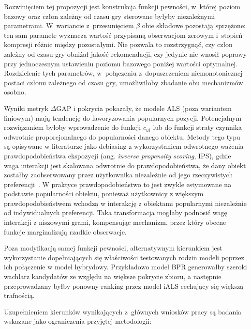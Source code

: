 Rozwinięciem tej propozycji jest konstrukcja funkcji pewności, w~której poziom bazowy oraz człon zależny od czasu gry sterowane byłyby niezależnymi parametrami. W~wariancie z~przesunięciem $\beta$ obie składowe pozostają sprzężone: ten sam parametr wyznacza wartość przypisaną obserwacjom zerowym i~stopień kompresji różnic między pozostałymi. Nie pozwala to rozstrzygnąć, czy człon zależny od czasu gry obniżał jakość rekomendacji, czy jedynie nie wnosił poprawy przy jednoczesnym ustawieniu poziomu bazowego poniżej wartości optymalnej. Rozdzielenie tych parametrów, w~połączeniu z~dopuszczeniem niemonotonicznej postaci członu zależnego od czasu gry, umożliwiłoby zbadanie obu mechanizmów osobno.

Wyniki metryk $\Delta$GAP i pokrycia pokazały, że modele ALS (poza wariantem liniowym) mają tendencję do faworyzowania popularnych pozycji. Potencjalnym rozwiązaniem byłoby wprowadzenie do funkcji $c_{ui}$ lub do funkcji straty czynnika odwrotnie proporcjonalnego do popularności danego obiektu. Metody tego typu są opisywane w literaturze jako debiasing z wykorzystaniem odwrotnego ważenia prawdopodobieństwa ekspozycji (ang. \textit{inverse propensity scoring}, IPS), gdzie waga interakcji jest skalowana odwrotnie do prawdopodobieństwa, że dany obiekt zostałby zaobserwowany przez użytkownika niezależnie od jego rzeczywistych preferencji~\cite{schnabel2016recommendations}. W praktyce prawdopodobieństwo to jest zwykle estymowane na podstawie popularności obiektu, ponieważ użytkownicy z większym prawdopodobieństwem wchodzą w interakcję z obiektami popularnymi niezależnie od indywidualnych preferencji. Taka transformacja mogłaby podnosić wagę interakcji z niszowymi grami, kompensując mechanizm, przez który obecne funkcje marginalizują rzadkie obserwacje.

Poza modyfikacją samej funkcji pewności, alternatywnym kierunkiem jest wykorzystanie dopełniających się właściwości testowanych rodzin modeli poprzez ich połączenie w model hybrydowy. Przykładowo model BPR generowałby szeroki wachlarz kandydatów ze względu na większe pokrycie zbioru, a następnie przeprowadzany byłby ponowny ranking przez model iALS cechujący się większą trafnością.

Uzupełnieniem kierunków wynikających z~głównych wniosków pracy są badania wskazane jako ograniczenia przyjętej metodologii:

